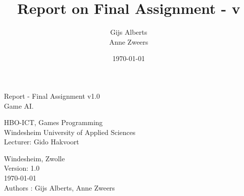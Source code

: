\documentclass[12pt, a4paper]{article}
\title{Report on Final Assignment - v\version}
\date{\today}
\author{Gijs Alberts \\ Anne Zweers}
\def \version {1.0}
\begin{document}
	\begin{titlepage}
		
		
		\LARGE Report - Final Assignment v\version \\
		\huge Game AI. \hfill
		\vspace{0.5cm}
		
		\small HBO-ICT, Games Programming \\
		Windesheim University of Applied Sciences \\
		Lecturer: Gido Hakvoort
		\begin{center}
			\vspace{4cm}
			\hspace*{-1.0cm}\textsl{}
		\end{center}
		\vfill
		\normalsize
		Windesheim, Zwolle \\
		Version: \version \\
		\today \\
		Authors : Gijs Alberts, Anne Zweers \\
	\end{titlepage}
	\restoregeometry
	\thispagestyle{empty}
	\newpage
	\begin{versionhistory}
	
	\end{versionhistory}
	\thispagestyle{empty}
	\newpage
	\setcounter{page}{1}
	\tableofcontents
	\newpage
\end{document}
